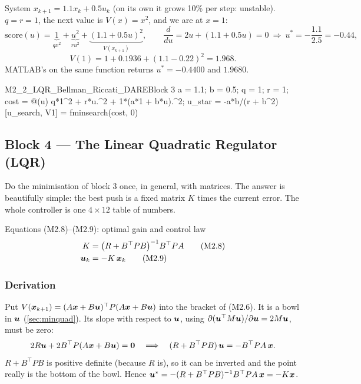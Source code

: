\begin{toy}
System $x_{k+1}=1.1x_k+0.5u_k$ (on its own it grows 10\% per step: unstable). $q=r=1$, the next value is $V(x)=x^2$, and
we are at $x=1$:
\[
\text{score}(u)=\underbrace{1}_{qx^2}+\underbrace{u^2}_{ru^2}+\underbrace{(1.1+0.5u)^2}_{V(x_{k+1})},\qquad
\frac{d}{du}=2u+(1.1+0.5u)=0\ \Rightarrow\ u^*=-\frac{1.1}{2.5}=-0.44,
\]
\[
V(1)=1+0.1936+(1.1-0.22)^2=1.968 .
\]
MATLAB's  on the same function returns $u^*=-0.4400$ and $1.9680$.
\end{toy}

\begin{toycode}{M2\_2\_LQR\_Bellman\_Riccati\_DARE}{Block 3}
a = 1.1;  b = 0.5;  q = 1;  r = 1;
cost = @(u) q*1^2 + r*u.^2 + 1*(a*1 + b*u).^2;
u_star = -a*b/(r + b^2)                 %
[u_search, V1] = fminsearch(cost, 0)   %
\end{toycode}

\subsection{Block 4 --- The Linear Quadratic Regulator (LQR)}
\label{sec:m2b4}

\begin{idea}
Do the minimisation of block 3 once, in general, with matrices. The answer is beautifully simple: the best push is a fixed
matrix $K$ times the current error. The whole controller is one $4\times12$ table of numbers.
\end{idea}

\begin{eqbox}{Equations (M2.8)--(M2.9): optimal gain and control law}
\begin{align}
  K&=\big(R+B^\top PB\big)^{-1}B^\top PA \tag{M2.8}\\
  \bm{u}_k&=-K\,\bm{x}_k \tag{M2.9}
\end{align}
\end{eqbox}

\subsubsection*{Derivation}
Put $V(\bm{x}_{k+1})=(A\bm{x}+B\bm{u})^\top P(A\bm{x}+B\bm{u})$ into the bracket of (M2.6). It is a bowl in $\bm{u}$ (\cref{sec:minquad}).
Its slope with respect to $\bm{u}$, using $\partial(\bm{u}^\top M\bm{u})/\partial\bm{u}=2M\bm{u}$, must be zero:
\[
2R\bm{u}+2B^\top P(A\bm{x}+B\bm{u})=\bm0\quad\Longrightarrow\quad(R+B^\top PB)\,\bm{u}=-B^\top PA\,\bm{x} .
\]
$R+B^\top PB$ is positive definite (because $R$ is), so it can be inverted and the point really is the bottom of the bowl.
Hence $\bm{u}^*=-(R+B^\top PB)^{-1}B^\top PA\,\bm{x}=-K\bm{x}$.

